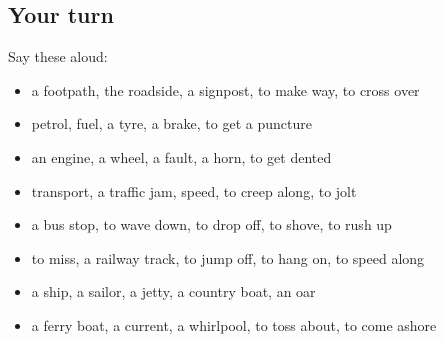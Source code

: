 \subsection*{Your turn}
Say these aloud:

\begin{itemize}
\raggedright
  \item a footpath, the roadside, a signpost, to make way, to cross over
  \item petrol, fuel, a tyre, a brake, to get a puncture
  \item an engine, a wheel, a fault, a horn, to get dented
  \item transport, a traffic jam, speed, to creep along, to jolt
  \item a bus stop, to wave down, to drop off, to shove, to rush up
  \item to miss, a railway track, to jump off, to hang on, to speed along
  \item a ship, a sailor, a jetty, a country boat, an oar
  \item a ferry boat, a current, a whirlpool, to toss about, to come ashore
\end{itemize}

